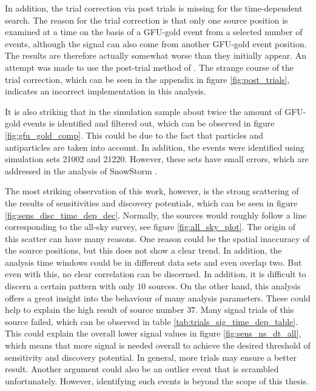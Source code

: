 In addition, the trial correction via post trials is missing for the time-dependent search.
The reason for the trial correction is that only one source position is examined at a time on the basis of a GFU-gold event from a selected number of events, although the signal can also come from another GFU-gold event position.
The results are therefore actually somewhat worse than they initially appear.
An attempt was made to use the post-trial method of \cite{thorben}.
The strange course of the trial correction, which can be seen in the appendix in figure \ref{fig:post_trials}, indicates an incorrect implementation in this analysis.

It is also striking that in the simulation sample about twice the amount of GFU-gold events is identified and filtered out, which can be observed in figure \ref{fig:gfu_gold_comp}.
This could be due to the fact that particles and antiparticles are taken into account.
In addition, the events were identified using simulation sets 21002 and 21220. However, these sets have small errors, which are addressed in the analysis of SnowStorm \cite{snowstorm}.

The most striking observation of this work, however, is the strong scattering of the results of sensitivities and discovery potentials, which can be seen in figure \ref{fig:sens_disc_time_dep_dec}.
Normally, the sources would roughly follow a line corresponding to the all-sky survey, see figure \ref{fig:all_sky_plot}.
The origin of this scatter can have many reasons. One reason could be the spatial inaccuracy of the source positions, but this does not show a clear trend.
In addition, the analysis time windows could be in different data sets and even overlap two.
But even with this, no clear correlation can be discerned.
In addition, it is difficult to discern a certain pattern with only $\num{10}$ sources.
On the other hand, this analysis offers a great insight into the behaviour of many analysis parameters.
These could help to explain the high result of source number $\num{37}$.
Many signal trials of this source failed, which can be observed in table \ref{tab:trials_sig_time_dep_table}.
This could explain the overall lower signal values in figure \ref{fig:sens_ns_dt_all}, which means that more signal is needed overall to achieve the desired threshold of sensitivity and discovery potential.
In general, more trials may ensure a better result.
Another argument could also be an outlier event that is scrambled unfortunately.
However, identifying such events is beyond the scope of this thesis.

